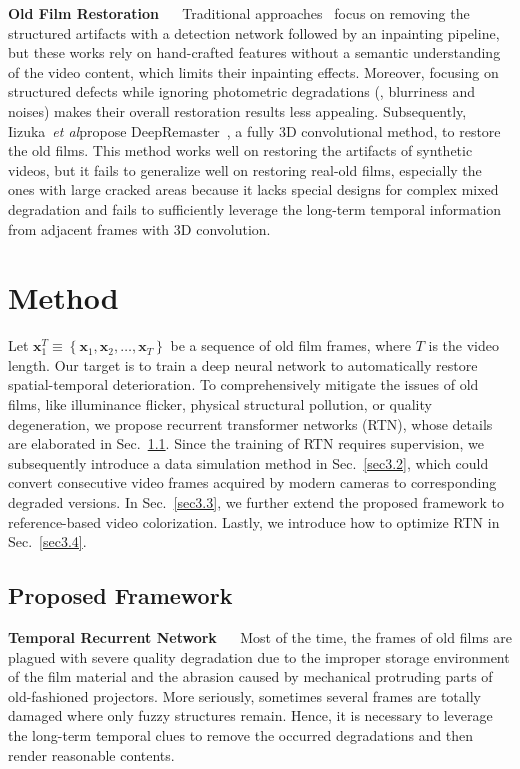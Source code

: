 \documentclass[10pt,twocolumn,letterpaper]{article}
\def\etal{\emph{et al}\onedot}
\begin{document}
	\noindent\textbf{Old Film Restoration} ~~ Traditional approaches~\cite{giakoumis2005digital,hongying2009efficient,kim2006efficient,saito1999image} focus on removing the structured artifacts with a detection network followed by an inpainting pipeline, but these works rely on hand-crafted features without a semantic understanding of the video content, which limits their inpainting effects. Moreover, focusing on structured defects while ignoring photometric degradations (\eg, blurriness and noises) makes their overall restoration results less appealing. Subsequently, Iizuka~\etal propose DeepRemaster~\cite{iizuka2019deepremaster}, a fully 3D convolutional method, to restore the old films. This method works well on restoring the artifacts of synthetic videos, but it fails to generalize well on restoring real-old films, especially the ones with large cracked areas because it lacks special designs for complex mixed degradation and fails to sufficiently leverage the long-term temporal information from adjacent frames with 3D convolution.
	
	
	\section{Method}
	
	Let $\mathbf{x}_{1}^{T} \equiv\left\{\mathbf{x}_{1}, \mathbf{x}_{2}, \ldots, \mathbf{x}_{T}\right\}$ be a sequence of old film frames, where $T$ is the video length. Our target is to train a deep neural network to automatically restore spatial-temporal deterioration. To comprehensively mitigate the issues of old films, like illuminance flicker, physical structural pollution, or quality degeneration, we propose recurrent transformer networks (RTN), whose details are elaborated in Sec.~\ref{sec3.1}. Since the training of RTN requires supervision, we subsequently introduce a data simulation method in Sec.~\ref{sec3.2}, which could convert consecutive video frames acquired by modern cameras to corresponding degraded versions. In Sec.~\ref{sec3.3}, we further extend the proposed framework to reference-based video colorization.  Lastly,  we introduce how to optimize RTN in Sec.~\ref{sec3.4}. 
	
	\subsection{Proposed Framework}\label{sec3.1}
	
	\noindent\textbf{Temporal Recurrent Network} ~~ Most of the time, the frames of old films are plagued with severe quality degradation due to the improper storage environment of the film material and the abrasion caused by mechanical protruding parts of old-fashioned projectors. More seriously, sometimes several frames are totally damaged where only fuzzy structures remain. Hence, it is necessary to leverage the long-term temporal clues to remove the occurred degradations and then render reasonable contents.
	
\end{document}
